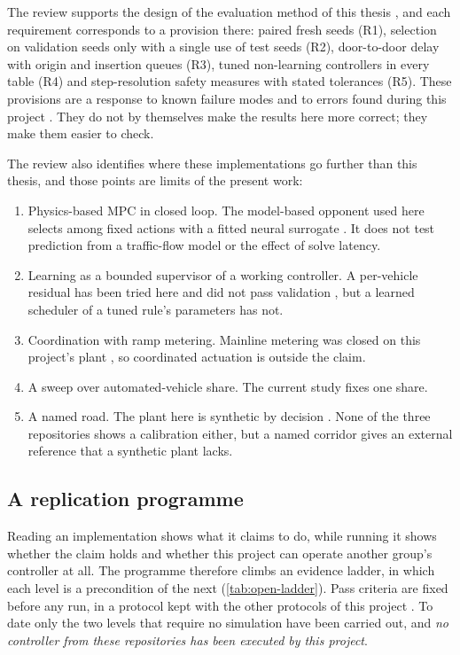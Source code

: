 The review supports the design of the evaluation method of this thesis , and each requirement corresponds to a provision there: paired fresh seeds (R1), selection on validation seeds only with a single use of test seeds (R2), door-to-door delay with origin and insertion queues (R3), tuned non-learning controllers in every table (R4) and step-resolution safety measures with stated tolerances (R5). These provisions are a response to known failure modes and to errors found during this project . They do not by themselves make the results here more correct; they make them easier to check.

The review also identifies where these implementations go further than this thesis, and those points are limits of the present work:
\begin{enumerate}[nosep]
\item Physics-based MPC in closed loop. The model-based opponent used here selects among fixed actions with a fitted neural surrogate . It does not test prediction from a traffic-flow model or the effect of solve latency.
\item Learning as a bounded supervisor of a working controller. A per-vehicle residual has been tried here and did not pass validation , but a learned scheduler of a tuned rule's parameters has not.
\item Coordination with ramp metering. Mainline metering was closed on this project's plant , so coordinated actuation is outside the claim.
\item A sweep over automated-vehicle share. The current study fixes one share.
\item A named road. The plant here is synthetic by decision . None of the three repositories shows a calibration either, but a named corridor gives an external reference that a synthetic plant lacks.
\end{enumerate}

\subsection{A replication programme}\label{sec:open-impl-replication}

Reading an implementation shows what it claims to do, while running it shows whether the claim holds and whether this project can operate another group's controller at all. The programme therefore climbs an evidence ladder, in which each level is a precondition of the next (\cref{tab:open-ladder}). Pass criteria are fixed before any run, in a protocol kept with the other protocols of this project . To date only the two levels that require no simulation have been carried out, and \emph{no controller from these repositories has been executed by this project}.

